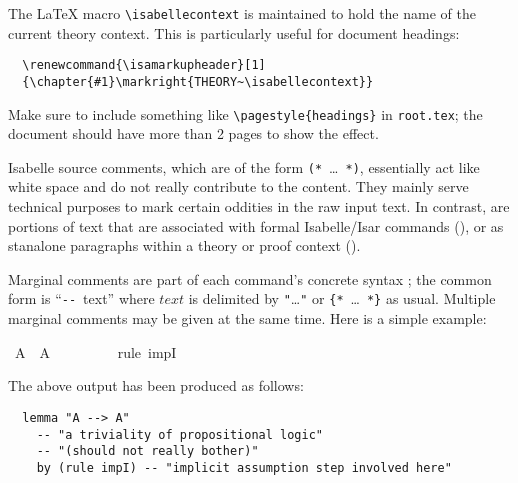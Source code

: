 \begin{isabellebody}
\begin{isamarkuptext}
  \medskip The {\LaTeX} macro \verb,\isabellecontext, is maintained to
  hold the name of the current theory context.  This is particularly
  useful for document headings:

\begin{verbatim}
  \renewcommand{\isamarkupheader}[1]
  {\chapter{#1}\markright{THEORY~\isabellecontext}}
\end{verbatim}

  \noindent Make sure to include something like
  \verb,\pagestyle{headings}, in \texttt{root.tex}; the document
  should have more than 2 pages to show the effect.%
\end{isamarkuptext}%
\isamarkuptrue%
%
\isamarkuptrue%
%
\begin{isamarkuptext}%
Isabelle source comments, which are of the form
  \verb,(,\verb,*,~\dots~\verb,*,\verb,),, essentially act like white
  space and do not really contribute to the content.  They mainly
  serve technical purposes to mark certain oddities in the raw input
  text.  In contrast,  are portions of text
  that are associated with formal Isabelle/Isar commands
  (), or as stanalone paragraphs within a
  theory or proof context ().

  \medskip Marginal comments are part of each command's concrete
  syntax \cite{isabelle-ref}; the common form is ``\verb,--,~text''
  where $text$ is delimited by \verb,",\dots\verb,", or
  \verb,{,\verb,*,~\dots~\verb,*,\verb,}, as usual.  Multiple marginal
  comments may be given at the same time.  Here is a simple example:%
\end{isamarkuptext}%
\isamarkuptrue%
\ {\isachardoublequote}A\ {\isacharminus}{\isacharminus}{\isachargreater}\ A{\isachardoublequote}\isanewline
\ \ %
\isanewline
\ \ %
\isanewline
\ \ \isamarkupfalse%
\ {\isacharparenleft}rule\ impI{\isacharparenright}\ %
\isamarkupfalse%
%
\begin{isamarkuptext}%
\noindent The above output has been produced as follows:

\begin{verbatim}
  lemma "A --> A"
    -- "a triviality of propositional logic"
    -- "(should not really bother)"
    by (rule impI) -- "implicit assumption step involved here"
\end{verbatim}


\end{isamarkuptext}
\end{isabellebody}
